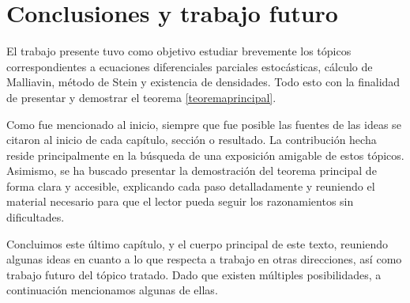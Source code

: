 \documentclass[letterpaper,twoside,12pt]{book}
\newcommand{\1}{\mathds{1}}
\theoremstyle{definition}
\theoremstyle{definition}
\theoremstyle{remark}
\theoremstyle{definition}
\theoremstyle{definition}
\theoremstyle{definition}
\theoremstyle{definition}
\theoremstyle{definition}
\begin{document}


\chapter{Conclusiones y trabajo futuro}
El trabajo presente tuvo como objetivo estudiar brevemente los tópicos correspondientes a ecuaciones diferenciales parciales estocásticas, cálculo de Malliavin, método de Stein y existencia de densidades. Todo esto con la finalidad de presentar y demostrar el teorema \ref{teoremaprincipal}. 

Como fue mencionado al inicio, siempre que fue posible las fuentes de las ideas se citaron al inicio de cada capítulo, sección o resultado. La contribución hecha reside principalmente en la búsqueda de una exposición amigable de estos tópicos. Asimismo, se ha buscado presentar la demostración del teorema principal de forma clara y accesible, explicando cada paso detalladamente y reuniendo el material necesario para que el lector pueda seguir los razonamientos sin dificultades.

Concluimos este último capítulo, y el cuerpo principal de este texto, reuniendo algunas ideas en cuanto a lo que respecta a trabajo en otras direcciones, así como trabajo futuro del tópico tratado. Dado que existen múltiples posibilidades, a continuación mencionamos algunas de ellas.
\end{document}
